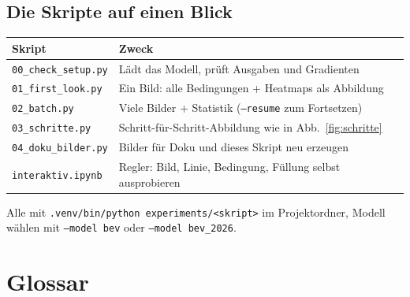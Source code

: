 \documentclass[11pt,a4paper]{article}
\newcommand{\code}[1]{\texttt{#1}}
\begin{document}
\subsection*{Die Skripte auf einen Blick}

\begin{center}
\small
\begin{tabular}{ll}
\toprule
Skript & Zweck \\
\midrule
\code{00\_check\_setup.py} & Lädt das Modell, prüft Ausgaben und Gradienten \\
\code{01\_first\_look.py} & Ein Bild: alle Bedingungen + Heatmaps als Abbildung \\
\code{02\_batch.py} & Viele Bilder + Statistik (\code{--resume} zum Fortsetzen) \\
\code{03\_schritte.py} & Schritt-für-Schritt-Abbildung wie in Abb.~\ref{fig:schritte} \\
\code{04\_doku\_bilder.py} & Bilder für Doku und dieses Skript neu erzeugen \\
\code{interaktiv.ipynb} & Regler: Bild, Linie, Bedingung, Füllung selbst ausprobieren \\
\bottomrule
\end{tabular}
\end{center}

Alle mit \code{.venv/bin/python experiments/<skript>} im Projektordner, Modell wählen mit
\code{--model bev} oder \code{--model bev\_2026}.

\section{Glossar}
\end{document}

